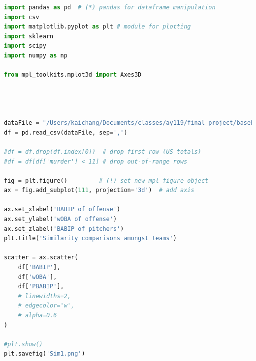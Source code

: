 \documentclass[12pt]{article}
\numberwithin{equation}{subsection}
\begin{document}
\bigskip

\begin{lstlisting}[language=Python, caption=3D Visualization]
import pandas as pd  # (*) pandas for dataframe manipulation
import csv
import matplotlib.pyplot as plt # module for plotting 
import sklearn
import scipy
import numpy as np

from mpl_toolkits.mplot3d import Axes3D




dataFile = "/Users/kaichang/Documents/classes/ay119/final_project/baseball-team-similarity-master/results/2015 Philadelphia Phillies.csv"
df = pd.read_csv(dataFile, sep=',')

#df = df.drop(df.index[0])  # drop first row (US totals) 
#df = df[df['murder'] < 11] # drop out-of-range rows

fig = plt.figure()         # (!) set new mpl figure object
ax = fig.add_subplot(111, projection='3d')  # add axis

ax.set_xlabel('BABIP of offense')
ax.set_ylabel('wOBA of offense')
ax.set_zlabel('BABIP of pitchers')
plt.title('Similarity comparisons amongst teams')

scatter = ax.scatter(
    df['BABIP'], 
    df['wOBA'], 
    df['PBABIP'],
    # linewidths=2, 
    # edgecolor='w',
    # alpha=0.6
)

#plt.show()
plt.savefig('Sim1.png')
\end{lstlisting}

\bigskip
{}
\end{document}
